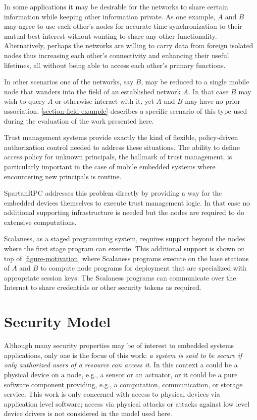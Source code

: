 In some applications it may be desirable for the networks to share certain information while
keeping other information private. As one example, $A$ and $B$ may agree to use each other's
nodes for accurate time synchronization to their mutual best interest without wanting to share
any other functionality. Alternatively, perhaps the networks are willing to carry data from
foreign isolated nodes thus increasing each other's connectivity and enhancing their useful
lifetimes, all without being able to access each other's primary functions.

In other scenarios one of the networks, say $B$, may be reduced to a single mobile node that
wanders into the field of an established network $A$. In that case $B$ may wish to query $A$ or
otherwise interact with it, yet $A$ and $B$ may have no prior association.
\autoref{section-field-example} describes a specific scenario of this type used during the
evaluation of the work presented here.

Trust management systems provide exactly the kind of flexible, policy-driven authorization
control needed to address these situations. The ability to define access policy for unknown
principals, the hallmark of trust management, is particularly important in the case of mobile
embedded systems where encountering new principals is routine.

SpartanRPC addresses this problem directly by providing a way for the embedded devices
themselves to execute trust management logic. In that case no additional supporting
infrastructure is needed but the nodes are required to do extensive computations.

Scalaness, as a staged programming system, requires support beyond the nodes where the first
stage program can execute. This additional support is shown on top of
\autoref{figure-motivation} where Scalaness programs execute on the base stations of $A$ and $B$
to compute node programs for deployment that are specialized with appropriate session keys. The
Scalaness programs can communicate over the Internet to share credentials or other security
tokens as required.

\section{Security Model}

Although many security properties may be of interest to embedded systems applications, only one
is the focus of this work: \emph{a system is said to be secure if only authorized users of a
  resource can access it}. In this context a  could be a physical device on a
node, e.g., a sensor or an actuator, or it could be a pure software component providing, e.g., a
computation, communication, or storage service. This work is only concerned with access to
physical devices via application level software; access via physical attacks or attacks against
low level device drivers is not considered in the model used here.

